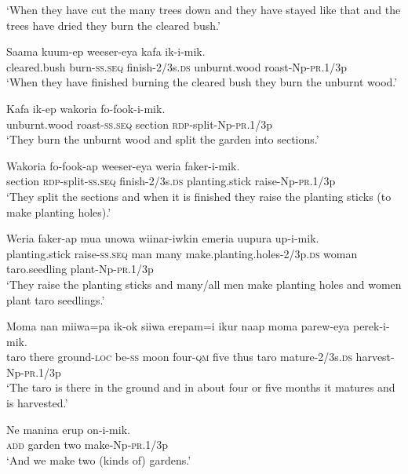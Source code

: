 \glt ‘When they have cut the many trees down and they have stayed like that and the trees have dried they burn the cleared bush.’ \\
\z


\ea
\gll  Saama  kuum-ep  weeser-eya  kafa  ik-i-mik. \\
cleared.bush  burn-\textsc{ss.seq}  finish-2/3s.\textsc{ds}  unburnt.wood  roast-Np-\textsc{pr}.1/3p \\
\glt ‘When they have finished burning the cleared bush they burn the unburnt wood.’ \\
\z


\ea
\gll  Kafa  ik-ep  wakoria  fo-fook-i-mik. \\
unburnt.wood  roast-\textsc{ss.seq}  section  \textsc{rdp}-split-Np-\textsc{pr}.1/3p \\
\glt ‘They burn the unburnt wood and split the garden into sections.’ \\
\z


\ea
\gll  Wakoria  fo-fook-ap  weeser-eya  weria  faker-i-mik. \\
section  \textsc{rdp}-split-\textsc{ss.seq}  finish-2/3s.\textsc{ds}  planting.stick  raise-Np-\textsc{pr}.1/3p \\
\glt ‘They split the sections and when it is finished they raise the planting sticks (to make planting holes).’ \\
\z


\ea
\gll  Weria  faker-ap  mua  unowa  wiinar-iwkin  emeria                     uupura  up-i-mik. \\
planting.stick  raise-\textsc{ss.seq}  man  many  make.planting.holes-2/3p.\textsc{ds}  woman taro.seedling  plant-Np-\textsc{pr}.1/3p \\


\glt ‘They raise the planting sticks and many/all men make planting holes and women plant taro seedlings.’ \\
\z


\ea
\gll  Moma  nan  miiwa=pa  ik-ok  siiwa  erepam=i  ikur  naap  moma parew-eya  perek-i-mik. \\
taro  there  ground-\textsc{loc}  be-\textsc{ss}  moon  four-\textsc{qm}  five  thus  taro     mature-2/3s.\textsc{ds}  harvest-Np-\textsc{pr}.1/3p \\


\glt ‘The taro is there in the ground and in about four or five months it matures and is harvested.’ \\
\z


\ea
\gll  Ne  manina  erup  on-i-mik. \\
\textsc{add}  garden  two  make-Np-\textsc{pr}.1/3p \\
\glt ‘And we make two (kinds of) gardens.’ \\
\z


